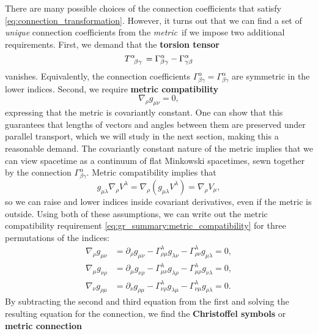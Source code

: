 There are many possible choices of the connection coefficients that satisfy \cref{eq:connection_transformation}.
However, it turns out that we can find a set of \emph{unique} connection coefficients from the \emph{metric} if we impose two additional requirements.
First, we demand that the \textbf{torsion tensor}
\begin{equation}
	T\indices{^\alpha_\beta_\gamma} = \Gamma^\alpha_{\beta\gamma} - \Gamma^\alpha_{\gamma\beta}
	\label{eq:torsion_tensor}
\end{equation}
vanishes.
Equivalently, the connection coefficients $ \Gamma^\alpha_{\beta\gamma} = \Gamma^\alpha_{\beta\gamma} $ are symmetric in the lower indices.
Second, we require \textbf{metric compatibility}
\begin{equation}
	\nabla_\rho g_{\mu \nu} = 0 ,
\label{eq:gr_summary:metric_compatibility}
\end{equation}
expressing that the metric is covariantly constant.
One can show that this guarantees that lengths of vectors and angles between them are preserved under parallel transport, which we will study in the next section, making this a reasonable demand. \cite[equation 2.10]{ref:hehl}
The covariantly constant nature of the metric implies that we can view spacetime as a continuum of flat Minkowski spacetimes, sewn together by the connection $\Gamma^\alpha_{\beta \gamma}$.
Metric compatibility implies that
\begin{equation}
	g_{\mu \lambda} \nabla_\rho V^\lambda = \nabla_\rho (g_{\mu \lambda} V^\lambda) = \nabla_\rho V_\mu ,
\end{equation}
so we can raise and lower indices inside covariant derivatives, even if the metric is outside.
Using both of these assumptions, we can write out the metric compatibility requirement \eqref{eq:gr_summary:metric_compatibility} for three permutations of the indices:
\newcommand\metriccompatibilityequation[3]{\nabla_{#1} g_{{#2}{#3}} &= \partial_{#1} g_{{#2}{#3}} - \Gamma^\lambda_{{#1}{#2}} g_{\lambda {#3}} - \Gamma^\lambda_{{#1}{#3}} g_{{#2} \lambda} = 0}
\begin{subequations}
\begin{align}
	\metriccompatibilityequation{\rho}{\mu}{\nu} , \\
	\metriccompatibilityequation{\mu}{\nu}{\rho} , \\
	\metriccompatibilityequation{\nu}{\rho}{\mu} .
\end{align}
\end{subequations}
By subtracting the second and third equation from the first and solving the resulting equation for the connection, we find the \textbf{Christoffel symbols} or \textbf{metric connection}
